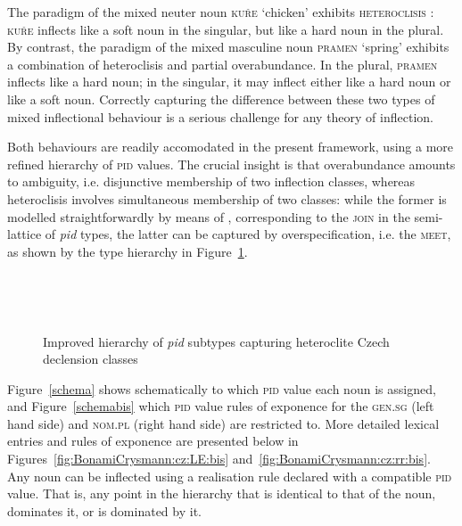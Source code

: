 \documentclass[output=paper]{langsci/langscibook}
\begin{document}
The paradigm of the mixed neuter noun \textsc{kuře} `chicken' exhibits
\textsc{heteroclisis} \citep{Stump06}: \textsc{kuře} inflects like a
soft noun in the singular, but like a hard noun in the plural. By
contrast, the paradigm of the mixed masculine noun \textsc{pramen}
`spring' exhibits a combination of heteroclisis and partial
overabundance. In the plural, \textsc{pramen} inflects like a hard
noun; in the singular, it may inflect either like a hard noun or like
a soft noun. Correctly capturing the difference between these two
types of mixed inflectional behaviour is a serious challenge for any
theory of inflection.

Both behaviours are readily accomodated in the present framework,
using a more refined hierarchy of \textsc{pid} values. The crucial
insight is that overabundance amounts to ambiguity, i.e. disjunctive
membership of two inflection classes, whereas heteroclisis involves
simultaneous membership of two classes: while the former is modelled
straightforwardly by means of , corresponding to the
\textsc{join} in the semi-lattice of \textit{pid} types, the latter
can be captured by overspecification, i.e.  the \textsc{meet}, as
shown by the type hierarchy in Figure~\ref{fig:BonamiCrysmann:cz:hier:bis}.


\begin{figure}[t]
\centering\smaller
\itshape


\vspace*{1.5\baselineskip}
~~~~~~~~~~~

\vspace*{1.5\baselineskip}
~~~~%
~~~~%
\normalfont
\caption{Improved hierarchy of \emph{pid} subtypes capturing heteroclite Czech declension classes\label{fig:BonamiCrysmann:cz:hier:bis}}
\end{figure}


Figure~\ref{schema} shows schematically to which \textsc{pid} value each
noun is assigned, and Figure~\ref{schemabis} which \textsc{pid} value
rules of exponence for the \textsc{gen.sg} (left hand side) and
\textsc{nom.pl} (right hand side) are restricted to. More detailed
lexical entries and rules of exponence are presented below in
Figures~\ref{fig:BonamiCrysmann:cz:LE:bis} and~\ref{fig:BonamiCrysmann:cz:rr:bis}. Any noun can be
inflected using a realisation rule declared with a compatible
\textsc{pid} value. That is, any point in the hierarchy that is
identical to that of the noun, dominates it, or is dominated by
it.
\end{document}
